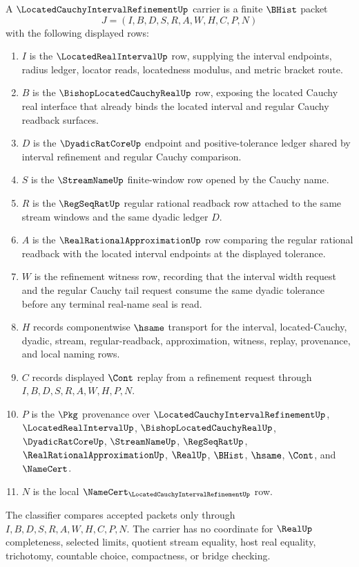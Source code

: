 \begin{definition}
\label{def:located-cauchy-interval-refinement-carrier}
A $\LocatedCauchyIntervalRefinementUp$ carrier is a finite $\BHist$ packet
$$
J=(I,B,D,S,R,A,W,H,C,P,N)
$$
with the following displayed rows:
\begin{enumerate}
\item $I$ is the $\LocatedRealIntervalUp$ row, supplying the interval endpoints, radius ledger, locator reads, locatedness modulus, and metric bracket route.
\item $B$ is the $\BishopLocatedCauchyRealUp$ row, exposing the located Cauchy real interface that already binds the located interval and regular Cauchy readback surfaces.
\item $D$ is the $\DyadicRatCoreUp$ endpoint and positive-tolerance ledger shared by interval refinement and regular Cauchy comparison.
\item $S$ is the $\StreamNameUp$ finite-window row opened by the Cauchy name.
\item $R$ is the $\RegSeqRatUp$ regular rational readback row attached to the same stream windows and the same dyadic ledger $D$.
\item $A$ is the $\RealRationalApproximationUp$ row comparing the regular rational readback with the located interval endpoints at the displayed tolerance.
\item $W$ is the refinement witness row, recording that the interval width request and the regular Cauchy tail request consume the same dyadic tolerance before any terminal real-name seal is read.
\item $H$ records componentwise $\hsame$ transport for the interval, located-Cauchy, dyadic, stream, regular-readback, approximation, witness, replay, provenance, and local naming rows.
\item $C$ records displayed $\Cont$ replay from a refinement request through $I,B,D,S,R,A,W,H,P,N$.
\item $P$ is the $\Pkg$ provenance over $\LocatedCauchyIntervalRefinementUp$, $\LocatedRealIntervalUp$, $\BishopLocatedCauchyRealUp$, $\DyadicRatCoreUp$, $\StreamNameUp$, $\RegSeqRatUp$, $\RealRationalApproximationUp$, $\RealUp$, $\BHist$, $\hsame$, $\Cont$, and $\NameCert$.
\item $N$ is the local $\NameCert_{\LocatedCauchyIntervalRefinementUp}$ row.
\end{enumerate}
The classifier compares accepted packets only through $I,B,D,S,R,A,W,H,C,P,N$. The carrier has no coordinate for $\RealUp$ completeness, selected limits, quotient stream equality, host real equality, trichotomy, countable choice, compactness, or bridge checking.
\end{definition}

